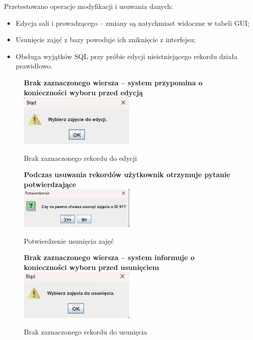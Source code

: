 Przetestowano operacje modyfikacji i usuwania danych:

\begin{itemize}
    \item Edycja sali i prowadzącego – zmiany są natychmiast widoczne w tabeli GUI;
    \item Usunięcie zajęć z bazy powoduje ich zniknięcie z interfejsu;
    \item Obsługa wyjątków SQL przy próbie edycji nieistniejącego rekordu działa prawidłowo.
\end{itemize}

\begin{figure}[H]
\centering
\textbf{Brak zaznaczonego wiersza – system przypomina o konieczności wyboru przed edycją}\\[0.5em]
\includegraphics[width=0.5\textwidth]{figures/Warning/select_zajecia_to_edit.png}
\caption{Brak zaznaczonego rekordu do edycji}
\label{fig:warn-edit}
\end{figure}

\begin{figure}[H]
\centering
\textbf{Podczas usuwania rekordów użytkownik otrzymuje pytanie potwierdzające}\\[0.5em]
\includegraphics[width=0.5\textwidth]{figures/Warning/delete_warning.png}
\caption{Potwierdzenie usunięcia zajęć}
\label{fig:warn-delete}
\end{figure}

\begin{figure}[H]
\centering
\textbf{Brak zaznaczonego wiersza – system informuje o konieczności wyboru przed usunięciem}\\[0.5em]
\includegraphics[width=0.5\textwidth]{figures/Warning/select_zajecia.png}
\caption{Brak zaznaczonego rekordu do usunięcia}
\label{fig:warn-no-selection}
\end{figure}

